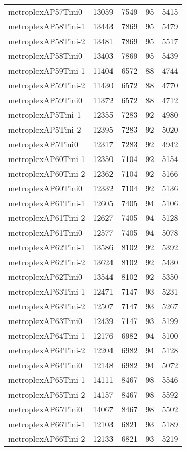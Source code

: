 \begin{longtable}{lrrrr}
metroplexAP57Tini0 & 13059 & 7549 & 95 & 5415 \\
metroplexAP58Tini-1 & 13443 & 7869 & 95 & 5479 \\
metroplexAP58Tini-2 & 13481 & 7869 & 95 & 5517 \\
metroplexAP58Tini0 & 13403 & 7869 & 95 & 5439 \\
metroplexAP59Tini-1 & 11404 & 6572 & 88 & 4744 \\
metroplexAP59Tini-2 & 11430 & 6572 & 88 & 4770 \\
metroplexAP59Tini0 & 11372 & 6572 & 88 & 4712 \\
metroplexAP5Tini-1 & 12355 & 7283 & 92 & 4980 \\
metroplexAP5Tini-2 & 12395 & 7283 & 92 & 5020 \\
metroplexAP5Tini0 & 12317 & 7283 & 92 & 4942 \\
metroplexAP60Tini-1 & 12350 & 7104 & 92 & 5154 \\
metroplexAP60Tini-2 & 12362 & 7104 & 92 & 5166 \\
metroplexAP60Tini0 & 12332 & 7104 & 92 & 5136 \\
metroplexAP61Tini-1 & 12605 & 7405 & 94 & 5106 \\
metroplexAP61Tini-2 & 12627 & 7405 & 94 & 5128 \\
metroplexAP61Tini0 & 12577 & 7405 & 94 & 5078 \\
metroplexAP62Tini-1 & 13586 & 8102 & 92 & 5392 \\
metroplexAP62Tini-2 & 13624 & 8102 & 92 & 5430 \\
metroplexAP62Tini0 & 13544 & 8102 & 92 & 5350 \\
metroplexAP63Tini-1 & 12471 & 7147 & 93 & 5231 \\
metroplexAP63Tini-2 & 12507 & 7147 & 93 & 5267 \\
metroplexAP63Tini0 & 12439 & 7147 & 93 & 5199 \\
metroplexAP64Tini-1 & 12176 & 6982 & 94 & 5100 \\
metroplexAP64Tini-2 & 12204 & 6982 & 94 & 5128 \\
metroplexAP64Tini0 & 12148 & 6982 & 94 & 5072 \\
metroplexAP65Tini-1 & 14111 & 8467 & 98 & 5546 \\
metroplexAP65Tini-2 & 14157 & 8467 & 98 & 5592 \\
metroplexAP65Tini0 & 14067 & 8467 & 98 & 5502 \\
metroplexAP66Tini-1 & 12103 & 6821 & 93 & 5189 \\
metroplexAP66Tini-2 & 12133 & 6821 & 93 & 5219 \\

\end{longtable}
